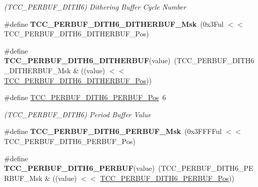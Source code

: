 \begin{DoxyCompactItemize}
\begin{DoxyCompactList}\small\item\em (T\+C\+C\+\_\+\+P\+E\+R\+B\+U\+F\+\_\+\+D\+I\+T\+H6) Dithering Buffer Cycle Number \end{DoxyCompactList}\item 
\hypertarget{group___s_a_m_l21___t_c_c_gaf8c5ac340ab830bff30afeef05062270}{}\#define {\bfseries T\+C\+C\+\_\+\+P\+E\+R\+B\+U\+F\+\_\+\+D\+I\+T\+H6\+\_\+\+D\+I\+T\+H\+E\+R\+B\+U\+F\+\_\+\+Msk}~(0x3\+Ful $<$$<$ T\+C\+C\+\_\+\+P\+E\+R\+B\+U\+F\+\_\+\+D\+I\+T\+H6\+\_\+\+D\+I\+T\+H\+E\+R\+B\+U\+F\+\_\+\+Pos)\label{group___s_a_m_l21___t_c_c_gaf8c5ac340ab830bff30afeef05062270}

\item 
\hypertarget{group___s_a_m_l21___t_c_c_ga7e07949840b928b514eb991e81b1f062}{}\#define {\bfseries T\+C\+C\+\_\+\+P\+E\+R\+B\+U\+F\+\_\+\+D\+I\+T\+H6\+\_\+\+D\+I\+T\+H\+E\+R\+B\+U\+F}(value)~(T\+C\+C\+\_\+\+P\+E\+R\+B\+U\+F\+\_\+\+D\+I\+T\+H6\+\_\+\+D\+I\+T\+H\+E\+R\+B\+U\+F\+\_\+\+Msk \& ((value) $<$$<$ \hyperlink{group___s_a_m_l21___t_c_c_gaeb8f3be1cefbdd18de66eb1542c0cbfa}{T\+C\+C\+\_\+\+P\+E\+R\+B\+U\+F\+\_\+\+D\+I\+T\+H6\+\_\+\+D\+I\+T\+H\+E\+R\+B\+U\+F\+\_\+\+Pos}))\label{group___s_a_m_l21___t_c_c_ga7e07949840b928b514eb991e81b1f062}

\item 
\hypertarget{group___s_a_m_l21___t_c_c_ga23983bb85331675ee916e9881e388dc5}{}\#define \hyperlink{group___s_a_m_l21___t_c_c_ga23983bb85331675ee916e9881e388dc5}{T\+C\+C\+\_\+\+P\+E\+R\+B\+U\+F\+\_\+\+D\+I\+T\+H6\+\_\+\+P\+E\+R\+B\+U\+F\+\_\+\+Pos}~6\label{group___s_a_m_l21___t_c_c_ga23983bb85331675ee916e9881e388dc5}

\begin{DoxyCompactList}\small\item\em (T\+C\+C\+\_\+\+P\+E\+R\+B\+U\+F\+\_\+\+D\+I\+T\+H6) Period Buffer Value \end{DoxyCompactList}\item 
\hypertarget{group___s_a_m_l21___t_c_c_ga03dc08b9fccdbf710fe0465af728023e}{}\#define {\bfseries T\+C\+C\+\_\+\+P\+E\+R\+B\+U\+F\+\_\+\+D\+I\+T\+H6\+\_\+\+P\+E\+R\+B\+U\+F\+\_\+\+Msk}~(0x3\+F\+F\+F\+Ful $<$$<$ T\+C\+C\+\_\+\+P\+E\+R\+B\+U\+F\+\_\+\+D\+I\+T\+H6\+\_\+\+P\+E\+R\+B\+U\+F\+\_\+\+Pos)\label{group___s_a_m_l21___t_c_c_ga03dc08b9fccdbf710fe0465af728023e}

\item 
\hypertarget{group___s_a_m_l21___t_c_c_ga14e352984e9344bdd4c191f64a6902c7}{}\#define {\bfseries T\+C\+C\+\_\+\+P\+E\+R\+B\+U\+F\+\_\+\+D\+I\+T\+H6\+\_\+\+P\+E\+R\+B\+U\+F}(value)~(T\+C\+C\+\_\+\+P\+E\+R\+B\+U\+F\+\_\+\+D\+I\+T\+H6\+\_\+\+P\+E\+R\+B\+U\+F\+\_\+\+Msk \& ((value) $<$$<$ \hyperlink{group___s_a_m_l21___t_c_c_ga23983bb85331675ee916e9881e388dc5}{T\+C\+C\+\_\+\+P\+E\+R\+B\+U\+F\+\_\+\+D\+I\+T\+H6\+\_\+\+P\+E\+R\+B\+U\+F\+\_\+\+Pos}))\label{group___s_a_m_l21___t_c_c_ga14e352984e9344bdd4c191f64a6902c7}


\end{DoxyCompactItemize}
